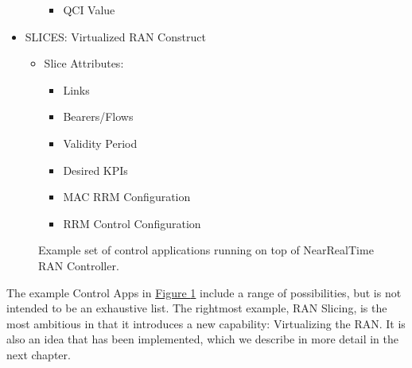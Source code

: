 \documentclass[a4paper,11pt,english]{sphinxmanual}
\let\sphinxpxdimen\pdfpxdimen\else\newdimen\sphinxpxdimen
\begin{document}
\begin{itemize}
\begin{itemize}
\begin{itemize}
\item {} 
\sphinxAtStartPar
QCI Value

\end{itemize}

\end{itemize}

\item {} 
\sphinxAtStartPar
SLICES: Virtualized RAN Construct
\begin{itemize}
\item {} 
\sphinxAtStartPar
Slice Attributes:
\begin{itemize}
\item {} 
\sphinxAtStartPar
Links

\item {} 
\sphinxAtStartPar
Bearers/Flows

\item {} 
\sphinxAtStartPar
Validity Period

\item {} 
\sphinxAtStartPar
Desired KPIs

\item {} 
\sphinxAtStartPar
MAC RRM Configuration

\item {} 
\sphinxAtStartPar
RRM Control Configuration

\end{itemize}

\end{itemize}

\end{itemize}

\begin{figure}[ht]
\centering
\capstart

\noindent\sphinxincludegraphics[width=500\sphinxpxdimen]{{Slide19}.png}
\caption{Example set of control applications running on top of
Near\sphinxhyphen{}Real\sphinxhyphen{}Time RAN Controller.}\label{\detokenize{ran:id5}}\label{\detokenize{ran:fig-ran-controller}}\end{figure}

\sphinxAtStartPar
The example Control Apps in \hyperref[\detokenize{ran:fig-ran-controller}]{Figure \ref{\detokenize{ran:fig-ran-controller}}}
include a range of possibilities, but is not intended to be an
exhaustive list.  The right\sphinxhyphen{}most example, RAN Slicing, is the most
ambitious in that it introduces a new capability: Virtualizing the
RAN. It is also an idea that has been implemented, which we describe
in more detail in the next chapter.
\end{document}
